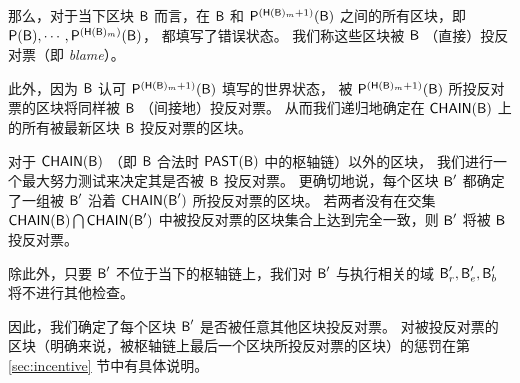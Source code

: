 	那么，对于当下区块 $\textsf{B}$ 而言，在 $\textsf{B}$ 和 $\mathsf{P}^{\left(\textsf{H}(\textsf{B})_{m}+1\right)}(\textsf{B})$ 之间的所有区块，即 $\mathsf{P}(\textsf{B}), \cdots, \mathsf{P}^{\left(\textsf{H}(\textsf{B})_{m}\right)}(\textsf{B})$，
	都填写了错误状态。
	我们称这些区块被 $\textsf{B}$ （直接）投反对票（即 \emph{blame}）。
	
	此外，因为 $\textsf{B}$ 认可 $\mathsf{P}^{\left(\textsf{H}(\textsf{B})_{m}+1\right)}(\textsf{B})$ 填写的世界状态，
	被 $\mathsf{P}^{\left(\textsf{H}(\textsf{B})_{m}+1\right)}(\textsf{B})$ 所投反对票的区块将同样被 $\textsf{B}$ （间接地）投反对票。
	从而我们递归地确定在 $\mathsf{CHAIN}(\textsf{B})$ 上的所有被最新区块 $\textsf{B}$ 投反对票的区块。

	对于 $\mathsf{CHAIN}(\textsf{B})$ （即 $\textsf{B}$ 合法时 $\mathsf{PAST}(\textsf{B})$ 中的枢轴链）以外的区块，
	我们进行一个最大努力测试来决定其是否被 $\textsf{B}$ 投反对票。
	更确切地说，每个区块 $\textsf{B}'$ 都确定了一组被 $\textsf{B}'$ 沿着 $\mathsf{CHAIN}(\textsf{B}')$ 所投反对票的区块。
	若两者没有在交集 $\mathsf{CHAIN}(\textsf{B})\bigcap\mathsf{CHAIN}(\textsf{B}')$ 中被投反对票的区块集合上达到完全一致，则 $\textsf{B}'$ 将被 $\textsf{B}$ 投反对票。
	
	除此外，只要 $\textsf{B}'$ 不位于当下的枢轴链上，我们对 $\textsf{B}'$ 与执行相关的域 $\textsf{B}'_r,\textsf{B}'_e,\textsf{B}'_b$ 将不进行其他检查。

	因此，我们确定了每个区块 $\textsf{B}'$ 是否被任意其他区块投反对票。
	对被投反对票的区块（明确来说，被枢轴链上最后一个区块所投反对票的区块）的惩罚在第 \ref{sec:incentive} 节中有具体说明。

